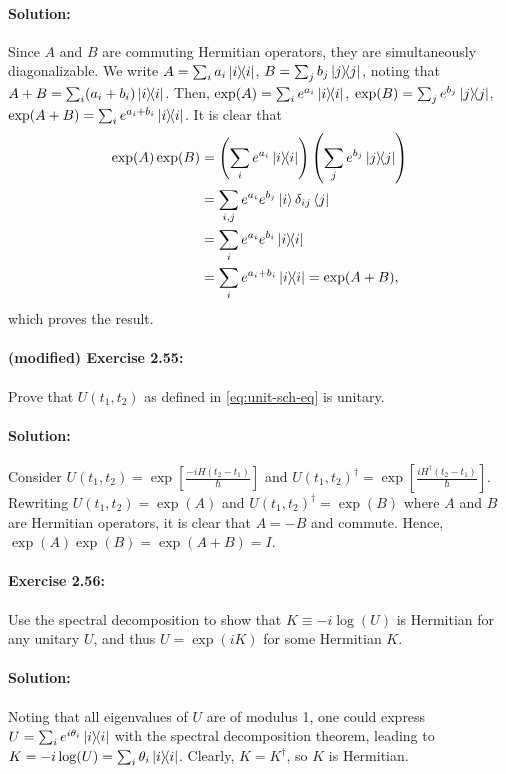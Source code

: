 \paragraph{Solution:} Since $A$ and $B$ are commuting Hermitian operators, they
are simultaneously diagonalizable. We write $A = \sum_i a_i\ketbra{i}{i}$,
$B = \sum_j b_j\ketbra{j}{j}$, noting that $A + B = \sum_i (a_i + b_i)
\ketbra{i}{i}$. Then, $\exp(A) = \sum_i e^{a_i}\ketbra{i}{i}$, $\exp(B) =
\sum_j e^{b_j}\ketbra{j}{j}$, $\exp(A + B) = \sum_i e^{a_i + b_i}
\ketbra{i}{i}$. It is clear that \begin{align*}
  \exp(A)\exp(B)
  &= \left(\sum_i e^{a_i}\ketbra{i}{i}\right)\left(\sum_j e^{b_j}
    \ketbra{j}{j}\right) \\
  &= \sum_{i, j} e^{a_i}e^{b_j}\ket{i}\delta_{ij}\bra{j} \\
  &= \sum_i e^{a_i}e^{b_i}\ketbra{i}{i} \\
  &= \sum_i e^{a_i + b_i}\ketbra{i}{i} = \exp(A + B),
\end{align*} which proves the result.

\paragraph{\cite{mikeandike} (modified) Exercise 2.55:} Prove that $U(t_1,
t_2)$ as defined in \eqref{eq:unit-sch-eq} is unitary.

\paragraph{Solution:} Consider $U(t_1, t_2) = \exp\left[\frac{-iH(t_2 - t_1)}
{\hbar}\right]$ and $U(t_1, t_2)^\dagger = \exp\left[\frac{iH^\dagger(t_2 -
t_1)}{\hbar}\right]$. Rewriting $U(t_1, t_2) = \exp(A)$ and $U(t_1,
t_2)^\dagger = \exp(B)$ where $A$ and $B$ are Hermitian operators, it is clear
that $A = -B$ and commute. Hence, $\exp(A)\exp(B) = \exp(A + B) = I$.

\paragraph{\cite{mikeandike} Exercise 2.56:} Use the spectral decomposition to
show that $K \equiv -i\log(U)$ is Hermitian for any unitary $U$, and thus $U =
\exp(iK)$ for some Hermitian $K$.

\paragraph{Solution:} Noting that all eigenvalues of $U$ are of modulus 1, one
could express $U = \sum_i e^{i\theta_i}\ketbra{i}{i}$ with the spectral
decomposition theorem, leading to $K = -i\log(U) = \sum_i \theta_i\ketbra{i}
{i}$. Clearly, $K = K^\dagger$, so $K$ is Hermitian.

